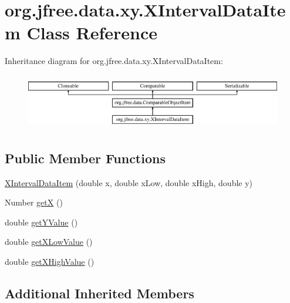 \hypertarget{classorg_1_1jfree_1_1data_1_1xy_1_1_x_interval_data_item}{}\section{org.\+jfree.\+data.\+xy.\+X\+Interval\+Data\+Item Class Reference}
\label{classorg_1_1jfree_1_1data_1_1xy_1_1_x_interval_data_item}
Inheritance diagram for org.\+jfree.\+data.\+xy.\+X\+Interval\+Data\+Item\+:\begin{figure}[H]
\begin{center}
\leavevmode
\includegraphics[height=2.456140cm]{classorg_1_1jfree_1_1data_1_1xy_1_1_x_interval_data_item}
\end{center}
\end{figure}
\subsection*{Public Member Functions}
\begin{DoxyCompactItemize}
\item 
\mbox{\hyperlink{classorg_1_1jfree_1_1data_1_1xy_1_1_x_interval_data_item_a00aedd3fe67890c9747817d4c43b6cae}{X\+Interval\+Data\+Item}} (double x, double x\+Low, double x\+High, double y)
\item 
Number \mbox{\hyperlink{classorg_1_1jfree_1_1data_1_1xy_1_1_x_interval_data_item_a050739546bbd302a55c6884b3e5307a9}{getX}} ()
\item 
double \mbox{\hyperlink{classorg_1_1jfree_1_1data_1_1xy_1_1_x_interval_data_item_abd6406791563bc52fd58c8822b633f78}{get\+Y\+Value}} ()
\item 
double \mbox{\hyperlink{classorg_1_1jfree_1_1data_1_1xy_1_1_x_interval_data_item_a7d4945af8f2c3d36616be45d15efde34}{get\+X\+Low\+Value}} ()
\item 
double \mbox{\hyperlink{classorg_1_1jfree_1_1data_1_1xy_1_1_x_interval_data_item_acc35c3d85006d59a8f31af11152757c9}{get\+X\+High\+Value}} ()
\end{DoxyCompactItemize}
\subsection*{Additional Inherited Members}


